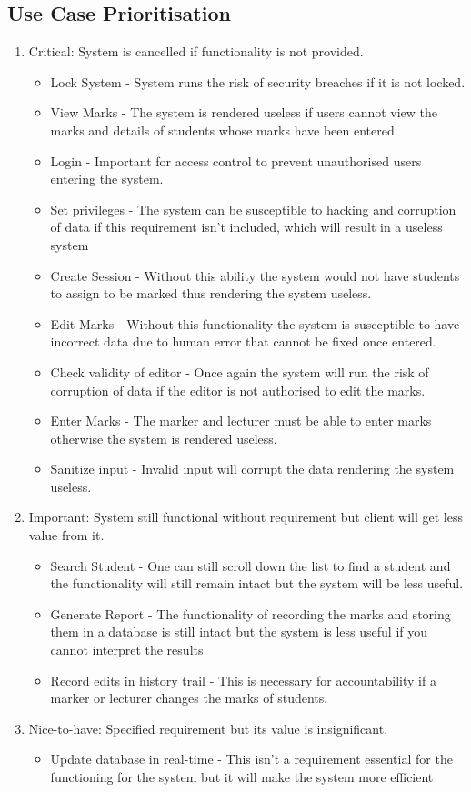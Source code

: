 \documentclass[a4paper]{article}
\begin{document}
		\subsection{Use Case Prioritisation}
			\begin{enumerate}
			\item Critical: System is cancelled if functionality is not provided.
			\begin{itemize}
			\item{Lock System - System runs the risk of security breaches if it is not locked.}
			\item{View Marks - The system is rendered useless if users cannot view the marks and details of students whose marks have been entered.}
			\item{Login - Important for access control to prevent unauthorised users entering the system.}
			\item {Set privileges - The system can be susceptible to hacking and corruption of data if this requirement isn't included, which will result in a useless system}
			\item {Create Session - Without this ability the system would not have students to assign to be marked thus rendering the system useless.}
			\item {Edit Marks - Without this functionality the system is susceptible to have incorrect data due to human error that cannot be fixed once entered.}
			\item {Check validity of editor - Once again the system will run the risk of corruption of data if the editor is not authorised to edit the marks.}
			\item {Enter Marks - The marker and lecturer must be able to enter marks otherwise the system is rendered useless.}
			\item {Sanitize input - Invalid input will corrupt the data rendering the system useless.}
			\end{itemize}
			\item Important: System still functional without requirement but client will get less value from it.
			\begin{itemize}
			\item {Search Student - One can still scroll down the list to find a student and the functionality will still remain intact but the system will be less useful.}
			\item { Generate Report - The functionality of recording the marks and storing them in a database is still intact but the system is less useful if you cannot interpret the results}
			\item { Record edits in history trail - This is necessary for accountability if a marker or lecturer changes the marks of students.}
			\end{itemize}
			\item Nice-to-have: Specified requirement but its value is insignificant.
			\begin{itemize}
				\item{Update database in real-time - This isn't a requirement essential for the functioning for the system but it will make the system more efficient}		
			\end{itemize}
			\end{enumerate}
\end{document}
